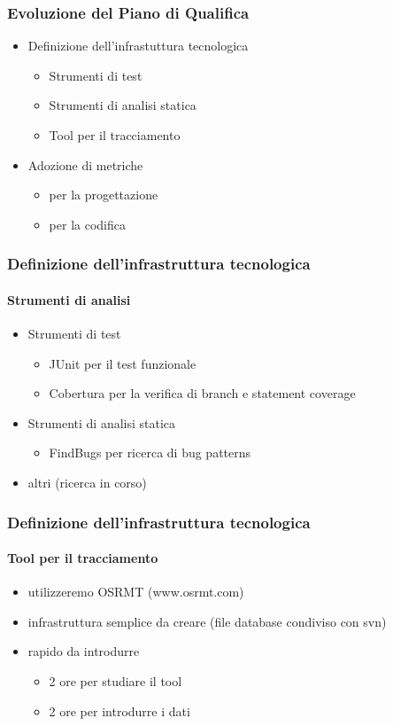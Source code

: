 \begin{frame}
\frametitle{Evoluzione del Piano di Qualifica}

\begin{itemize}
	\item Definizione dell'infrastuttura tecnologica
	\begin{itemize}
		\item Strumenti di test
		\item Strumenti di analisi statica
		\item Tool per il tracciamento
	\end{itemize}
	\item Adozione di metriche
	\begin{itemize}
		\item per la progettazione
		\item per la codifica
	\end{itemize}
\end{itemize}

\end{frame}

\begin{frame}
\frametitle{Definizione dell'infrastruttura tecnologica}
\framesubtitle{Strumenti di analisi}
\begin{itemize}
	\item Strumenti di test
	\begin{itemize}
		\item \alert{JUnit} per il test funzionale
		\item \alert{Cobertura} per la verifica di branch e statement coverage
	\end{itemize}
	\item Strumenti di analisi statica
	\begin{itemize}
		\item \alert{FindBugs} per ricerca di bug patterns
	\end{itemize}
	\item altri (ricerca in corso)
\end{itemize}
\end{frame}

\begin{frame}
\frametitle{Definizione dell'infrastruttura tecnologica}
\framesubtitle{Tool per il tracciamento}
\begin{itemize}
	\item utilizzeremo OSRMT (www.osrmt.com)
	\item infrastruttura semplice da creare (file database condiviso con svn)
	\item rapido da introdurre
	\begin{itemize}
\item 2 ore per studiare il tool
\item 2 ore per introdurre i dati
\end{itemize}

\end{itemize}
\end{frame}


